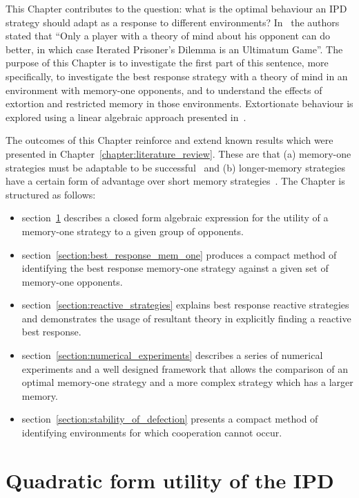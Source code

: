 This Chapter contributes to the question: what is the optimal behaviour an IPD
strategy should adapt as a response to different environments?
In~\cite{Press2012} the authors stated that ``Only a player with a theory of
mind about his opponent can do better, in which case Iterated Prisoner's Dilemma
is an Ultimatum Game''. The purpose of this Chapter is to investigate the first
part of this sentence, more specifically, to investigate the best response
strategy with a theory of mind in an environment with memory-one opponents, and
to understand the effects of extortion and restricted memory in those
environments. Extortionate behaviour is explored using a linear algebraic
approach presented in~\cite{Knight2019}.

The outcomes of this Chapter reinforce and extend known results which were presented in
Chapter~\ref{chapter:literature_review}. These are that (a) memory-one strategies must
be adaptable to be successful~\cite{Knight2017, Knight2019} and (b)
longer-memory strategies have a certain form of advantage over short memory
strategies~\cite{Hilbe2017, Pan2015}. The Chapter is structured as follows:

\begin{itemize}
    \item section~\ref{section:utility} describes a closed form algebraic expression for
    the utility of a memory-one strategy to a given group of opponents.
    \item section~\ref{section:best_response_mem_one} produces a compact method
    of identifying the best response memory-one strategy against a given set
    of memory-one opponents.
    \item section~\ref{section:reactive_strategies} explains best response reactive
    strategies and demonstrates the usage of resultant theory in explicitly finding
    a reactive best response.
    \item section~\ref{section:numerical_experiments} describes a series of numerical experiments
    and a well designed framework that allows the
    comparison of an optimal memory-one strategy and a more complex strategy which
    has a larger memory.
    \item section~\ref{section:stability_of_defection} presents a compact method of identifying environments
    for which cooperation cannot occur.
\end{itemize}


\section{Quadratic form utility of the IPD}\label{section:utility}

